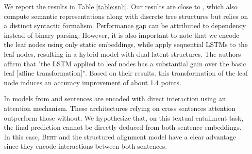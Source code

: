 We report the results in Table \ref{table:snli}. Our results are close to \textcite{choi_18}, which also compute semantic representations along with discrete tree structures but relies on a distinct syntactic formalism. Performance gap can be attributed to dependency instead of binary parsing. However, it is also important to note that we encode the leaf nodes using only static embeddings, while \textcite{choi_18} apply sequential LSTMs to the leaf nodes, resulting in a hybrid model with dual latent structures. The authors affirm that "the LSTM applied to leaf nodes has a substantial gain over the basic leaf [affine transformation]". Based on their results, this transformation of the leaf node induces an accuracy improvement of about 1.4 points. 

In models from \textcite{liu_18} and \textcite{zhang_20} sentences are encoded with direct interaction using an attention mechanism. These architectures relying on cross sentences attention outperform those without.
We hypothesize that, 
on this textual entailment task, the final prediction cannot be directly deduced from both sentence embeddings. In this case, \textsc{Bert} and the structured alignment model have a clear advantage since they encode interactions between both sentences.





